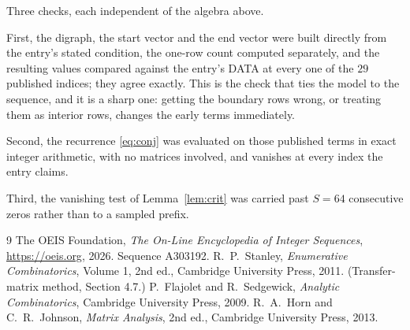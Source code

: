 \documentclass[11pt,a4paper]{article}
\theoremstyle{plain}
\theoremstyle{definition}
\begin{document}
Three checks, each independent of the algebra above.

First, the digraph, the start vector and the end vector were built directly from the
entry's stated condition, the one-row count computed separately, and the resulting values
compared against the entry's DATA at every one of the $29$ published indices; they
agree exactly. This is the check that ties the model to the sequence, and it is a sharp one:
getting the boundary rows wrong, or treating them as interior rows, changes the early terms
immediately.

Second, the recurrence \eqref{eq:conj} was evaluated on those published terms in exact
integer arithmetic, with no matrices involved, and vanishes at every index the entry claims.

Third, the vanishing test of Lemma~\ref{lem:crit} was carried past $S=64$ consecutive
zeros rather than to a sampled prefix.

\begin{thebibliography}{9}
 The OEIS Foundation, \emph{The On-Line Encyclopedia of Integer
Sequences}, \url{https://oeis.org}, 2026. Sequence A303192.
 R.~P.~Stanley, \emph{Enumerative Combinatorics}, Volume 1, 2nd ed.,
Cambridge University Press, 2011. (Transfer-matrix method, Section 4.7.)
 P.~Flajolet and R.~Sedgewick, \emph{Analytic Combinatorics}, Cambridge
University Press, 2009.
 R.~A.~Horn and C.~R.~Johnson, \emph{Matrix Analysis}, 2nd ed., Cambridge
University Press, 2013.
\end{thebibliography}
\end{document}
